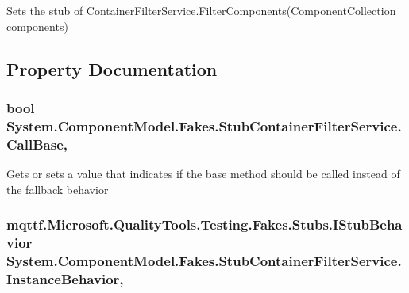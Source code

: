 Sets the stub of Container\-Filter\-Service.\-Filter\-Components(\-Component\-Collection components)



\subsection{Property Documentation}
\hypertarget{class_system_1_1_component_model_1_1_fakes_1_1_stub_container_filter_service_a26e65905c4e4fc9f4c5865840639ebc2}{
\subsubsection[{Call\-Base}]{\setlength{\rightskip}{0pt plus 5cm}bool System.\-Component\-Model.\-Fakes.\-Stub\-Container\-Filter\-Service.\-Call\-Base\hspace{0.3cm}{\ttfamily [get]}, {\ttfamily [set]}}}\label{class_system_1_1_component_model_1_1_fakes_1_1_stub_container_filter_service_a26e65905c4e4fc9f4c5865840639ebc2}


Gets or sets a value that indicates if the base method should be called instead of the fallback behavior

\hypertarget{class_system_1_1_component_model_1_1_fakes_1_1_stub_container_filter_service_a88cf5ace85c03ac0f3db58ef436c4af8}{
\subsubsection[{Instance\-Behavior}]{\setlength{\rightskip}{0pt plus 5cm}mqttf.\-Microsoft.\-Quality\-Tools.\-Testing.\-Fakes.\-Stubs.\-I\-Stub\-Behavior System.\-Component\-Model.\-Fakes.\-Stub\-Container\-Filter\-Service.\-Instance\-Behavior\hspace{0.3cm}{\ttfamily [get]}, {\ttfamily [set]}}}\label{class_system_1_1_component_model_1_1_fakes_1_1_stub_container_filter_service_a88cf5ace85c03ac0f3db58ef436c4af8}


